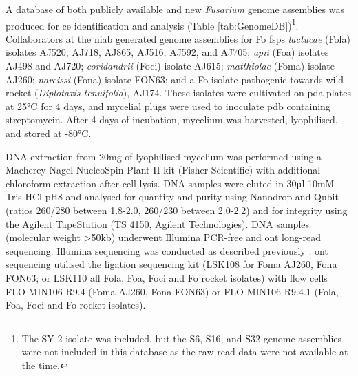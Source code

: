 A database of both publicly available and new \textit{Fusarium} genome assemblies was produced for \ac{ce} identification and analysis (Table \ref{tab:GenomeDB})\footnote{The SY-2 isolate was included, but the S6, S16, and S32 genome assemblies were not included in this database as the raw read data were not available at the time.}. Collaborators at the \acf{niab} generated genome assemblies for \ac{Fo} \acp{fsp} \textit{lactucae} (\acs{Fola}) isolates AJ520, AJ718, AJ865, AJ516, AJ592, and AJ705; \textit{apii} (\acs{Foa}) isolates AJ498 and AJ720; \textit{coridandrii} (\acs{Foci}) isolate AJ615; \textit{matthiolae} (\acs{Foma}) isolate AJ260; \textit{narcissi} (\acs{Fona}) isolate FON63; and a \ac{Fo} isolate pathogenic towards wild rocket (\textit{Diplotaxis tenuifolia}), AJ174. These isolates were cultivated on \ac{pda} plates at 25°C for 4 days, and mycelial plugs were used to inoculate \ac{pdb} containing streptomycin. After 4 days of incubation, mycelium was harvested, lyophilised, and stored at -80°C. 

DNA extraction from 20mg of lyophilised mycelium was performed using a Macher\-ey-Nagel NucleoSpin Plant II kit (Fisher Scientific) with additional chloroform extraction after cell lysis. DNA samples were eluted in 30µl 10mM Tris HCl pH8 and analysed for quantity and purity using Nanodrop and Qubit (ratios 260/280 between 1.8-2.0, 260/230 between 2.0-2.2)  and for integrity using the Agilent TapeStation (TS 4150, Agilent Technologies). DNA samples (molecular weight >50kb) underwent Illumina PCR-free and \ac{ont} long-read sequencing. Illumina sequencing was conducted as described previously \parencite{Armitage2018}. \ac{ont} sequencing utilised the ligation sequencing kit (LSK108 for \ac{Foma} AJ260, \ac{Fona} FON63; or LSK110 all \ac{Fola}, \ac{Foa}, \ac{Foci} and \ac{Fo} rocket isolates) with flow cells FLO-MIN106 R9.4 (\ac{Foma} AJ260, \ac{Fona} FON63) or FLO-MIN106 R9.4.1 (\ac{Fola}, \ac{Foa}, \ac{Foci} and \ac{Fo} rocket isolates). 

